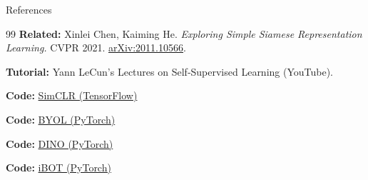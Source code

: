 \begin{frame}[allowframebreaks]{References}
\begin{thebibliography}{99}
\textbf{Related:} Xinlei Chen, Kaiming He. \emph{Exploring Simple Siamese Representation Learning.} CVPR 2021. \href{https://arxiv.org/abs/2011.10566}{arXiv:2011.10566}.

\textbf{Tutorial:} Yann LeCun’s Lectures on Self‑Supervised Learning (YouTube).

\textbf{Code:} \href{https://github.com/google-research/simclr}{SimCLR (TensorFlow)}

\textbf{Code:} \href{https://github.com/lucidrains/byol-pytorch}{BYOL (PyTorch)}

\textbf{Code:} \href{https://github.com/facebookresearch/dino}{DINO (PyTorch)}

\textbf{Code:} \href{https://github.com/bytedance/ibot}{iBOT (PyTorch)}

\end{thebibliography}
\end{frame}